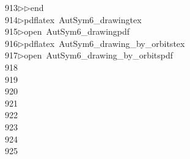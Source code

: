 \begin{tabbing}
913\>$\triangleright$\>$\triangleright$\>end\\[0pt]
914\>$\triangleright$\>pdflatex\ AutSym6\_drawingtex\\[0pt]
915\>$\triangleright$\>open\ AutSym6\_drawingpdf\\[0pt]
916\>$\triangleright$\>pdflatex\ AutSym6\_drawing\_by\_orbitstex\\[0pt]
917\>$\triangleright$\>open\ AutSym6\_drawing\_by\_orbitspdf\\[0pt]
918\>\\[0pt]
919\>\\[0pt]
920\>\\[0pt]
921\>\\[0pt]
922\>\\[0pt]
923\>\\[0pt]
924\>\\[0pt]
925\>\end{tabbing}
